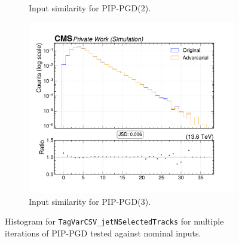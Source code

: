\begin{figure}[htbp]
\begin{subfigure}[t]{0.32\textwidth}
    \caption*{Input similarity for PIP-PGD(2).}
  \end{subfigure}\hfill
  \begin{subfigure}[t]{0.32\textwidth}
    \includegraphics[width=\linewidth]{media/output/features/compare/combined_it_3/cmp_global_features_TagVarCSV_jetNSelectedTracks.pdf}
    \caption*{Input similarity for PIP-PGD(3).}
  \end{subfigure}

  \caption*{Histogram for \texttt{TagVarCSV\_jetNSelectedTracks} for multiple iterations of PIP-PGD tested against nominal inputs.}
  \label{fig:combined_input_TagVarCSV_jetNSelectedTracks}
\end{figure}

